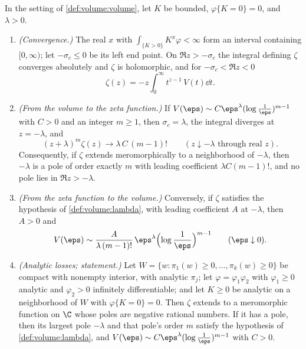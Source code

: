 \begin{refsection}
\begin{theorem}\label{thm:volume:zeta}
In the setting of \cref{def:volume:volume}, let $K$ be bounded, $\varphi\{K=0\}=0$, and $\lambda>0$.
\begin{enumerate}
\item \emph{(Convergence.)} The real $x$ with $\int_{\{K>0\}}K^x\varphi<\infty$ form an interval containing $[0,\infty)$; let $-\sigma_c\le0$ be its left end point. On $\Re z>-\sigma_c$ the integral defining $\zeta$ converges absolutely and $\zeta$ is holomorphic, and for $-\sigma_c<\Re z<0$
\begin{equation}\label{eq:volume:mellin}
\zeta(z)=-z\int_0^\infty t^{z-1}\,V(t)\dd t .
\end{equation}
\item \emph{(From the volume to the zeta function.)} If $V(\eps)\sim C\eps^\lambda(\log\frac1\eps)^{m-1}$ with $C>0$ and an integer $m\ge1$, then $\sigma_c=\lambda$, the integral diverges at $z=-\lambda$, and
\begin{equation}\label{eq:volume:zetalimit}
(z+\lambda)^m\zeta(z)\to\lambda\,C\,(m-1)!\qquad(z\downarrow-\lambda\text{ through real }z).
\end{equation}
Consequently, if $\zeta$ extends meromorphically to a neighborhood of $-\lambda$, then $-\lambda$ is a pole of order exactly $m$ with leading coefficient $\lambda C(m-1)!$, and no pole lies in $\Re z>-\lambda$.
\item \emph{(From the zeta function to the volume.)} Conversely, if $\zeta$ satisfies the hypothesis of \cref{def:volume:lambda}, with leading coefficient $A$ at $-\lambda$, then $A>0$ and
\[
V(\eps)\sim\frac{A}{\lambda\,(m-1)!}\,\eps^\lambda\Bigl(\log\frac1\eps\Bigr)^{m-1}\qquad(\eps\downarrow0).
\]
\item \emph{(Analytic losses; statement.)} Let $W=\{w:\pi_1(w)\ge0,\dots,\pi_k(w)\ge0\}$ be compact with nonempty interior, with analytic $\pi_j$; let $\varphi=\varphi_1\varphi_2$ with $\varphi_1\ge0$ analytic and $\varphi_2>0$ infinitely differentiable; and let $K\ge0$ be analytic on a neighborhood of $W$ with $\varphi\{K=0\}=0$. Then $\zeta$ extends to a meromorphic function on $\C$ whose poles are negative rational numbers. If it has a pole, then its largest pole $-\lambda$ and that pole's order $m$ satisfy the hypothesis of \cref{def:volume:lambda}, and $V(\eps)\sim C\eps^\lambda(\log\frac1\eps)^{m-1}$ with $C>0$.
\end{enumerate}
\end{theorem}


\end{refsection}
